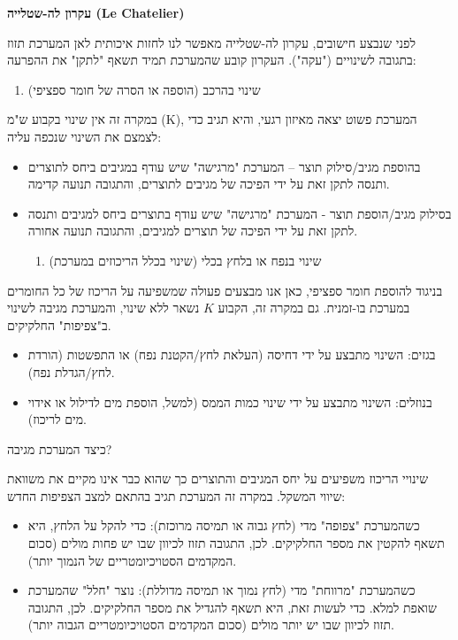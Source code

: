 \documentclass[
  hebrew,
  letterpaper,
  DIV=11,
  numbers=noendperiod]{scrreprt}
\providecommand{\tightlist}{%
  \setlength{\itemsep}{0pt}\setlength{\parskip}{0pt}}
\begin{document}
\textbf{עקרון לה-שטלייה (Le Chatelier)}

לפני שנבצע חישובים, עקרון לה-שטלייה מאפשר לנו לחזות איכותית לאן המערכת
תזוז בתגובה לשינויים ("עקה"). העקרון קובע שהמערכת תמיד תשאף "לתקן" את
ההפרעה:

\begin{enumerate}
\def\labelenumi{\arabic{enumi}.}
\tightlist
\item
  שינוי בהרכב (הוספה או הסרה של חומר ספציפי)
\end{enumerate}

במקרה זה אין שינוי בקבוע ש"מ (K), המערכת פשוט יצאה מאיזון רגעי, והיא
תגיב כדי לצמצם את השינוי שנכפה עליה:

\begin{itemize}
\item
  בהוספת מגיב/סילוק תוצר -- המערכת "מרגישה" שיש עודף במגיבים ביחס
  לתוצרים ותנסה לתקן זאת על ידי הפיכה של מגיבים לתוצרים, והתגובה תנועה
  קדימה.
\item
  בסילוק מגיב/הוספת תוצר - המערכת "מרגישה" שיש עודף בתוצרים ביחס למגיבים
  ותנסה לתקן זאת על ידי הפיכה של תוצרים למגיבים, והתגובה תנועה אחורה.

  \begin{enumerate}
  \def\labelenumi{\arabic{enumi}.}
  \tightlist
  \item
    שינוי בנפח או בלחץ בכלי (שינוי בכלל הריכוזים במערכת)
  \end{enumerate}
\end{itemize}

בניגוד להוספת חומר ספציפי, כאן אנו מבצעים פעולה שמשפיעה על הריכוז של כל
החומרים במערכת בו-זמנית. גם במקרה זה, הקבוע \(K\) נשאר ללא שינוי,
והמערכת מגיבה לשינוי ב"צפיפות" החלקיקים.

\begin{itemize}
\item
  בגזים: השינוי מתבצע על ידי דחיסה (העלאת לחץ/הקטנת נפח) או התפשטות
  (הורדת לחץ/הגדלת נפח).
\item
  בנוזלים: השינוי מתבצע על ידי שינוי כמות הממס (למשל, הוספת מים לדילול
  או אידוי מים לריכוז).
\end{itemize}

כיצד המערכת מגיבה?

שינויי הריכוז משפיעים על יחס המגיבים והתוצרים כך שהוא כבר אינו מקיים את
משוואת שיווי המשקל. במקרה זה המערכת תגיב בהתאם למצב הצפיפות החדש:

\begin{itemize}
\item
  כשהמערכת "צפופה" מדי (לחץ גבוה או תמיסה מרוכזת): כדי להקל על הלחץ, היא
  תשאף להקטין את מספר החלקיקים. לכן, התגובה תזוז לכיוון שבו יש פחות
  מולים (סכום המקדמים הסטויכיומטריים של הנמוך יותר).
\item
  כשהמערכת "מרווחת" מדי (לחץ נמוך או תמיסה מדוללת): נוצר "חלל" שהמערכת
  שואפת למלא. כדי לעשות זאת, היא תשאף להגדיל את מספר החלקיקים. לכן,
  התגובה תזוז לכיוון שבו יש יותר מולים (סכום המקדמים הסטויכיומטריים
  הגבוה יותר).
\end{itemize}
\end{document}
